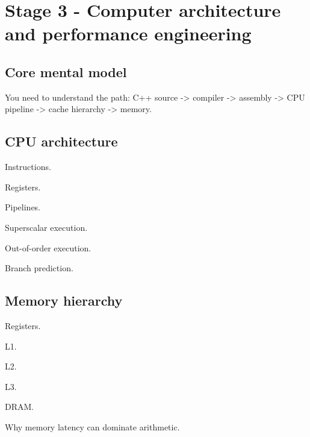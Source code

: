 \documentclass[11pt,letterpaper]{article}
\begin{document}
\section{Stage 3 - Computer architecture and performance engineering}\label{sec:7}

\label{stage:3}

\subsection*{Core mental model}

You need to understand the path: C++ source -> compiler -> assembly -> CPU pipeline -> cache hierarchy -> memory.

\subsection*{CPU architecture}

\begin{topics}

\item Instructions.

\item Registers.

\item Pipelines.

\item Superscalar execution.

\item Out-of-order execution.

\item Branch prediction.

\end{topics}

\subsection*{Memory hierarchy}

\begin{topics}

\item Registers.

\item L1.

\item L2.

\item L3.

\item DRAM.

\item Why memory latency can dominate arithmetic.

\end{topics}
\end{document}
